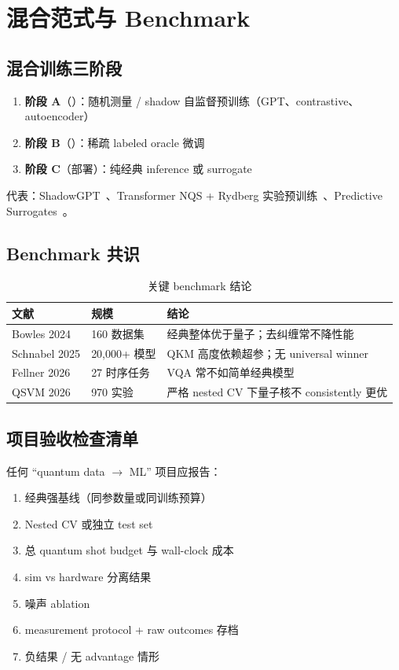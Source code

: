 \section{混合范式与 Benchmark}
\label{sec:hybrid-benchmark}

\subsection{混合训练三阶段}

\begin{enumerate}[leftmargin=*]
  \item \textbf{阶段 A}（\pathtwo{}）：随机测量 / shadow 自监督预训练（GPT、contrastive、autoencoder）
  \item \textbf{阶段 B}（\pathone{}）：稀疏 labeled oracle 微调
  \item \textbf{阶段 C}（部署）：纯经典 inference 或 surrogate
\end{enumerate}

代表：ShadowGPT~\cite{ShadowGPT2024}、Transformer NQS + Rydberg 实验预训练~\cite{TransformerNQSPretrain2025}、Predictive Surrogates~\cite{PredictiveSurrogates2026}。

\subsection{Benchmark 共识}

\begin{table}[htbp]
  \centering
  \caption{关键 benchmark 结论}
  \small
  \begin{tabular}{@{}llp{6.5cm}@{}}
    \toprule
    文献 & 规模 & 结论 \\
    \midrule
    Bowles 2024 & 160 数据集 & 经典整体优于量子；去纠缠常不降性能 \\
    Schnabel 2025 & 20,000+ 模型 & QKM 高度依赖超参；无 universal winner \\
    Fellner 2026 & 27 时序任务 & VQA 常不如简单经典模型 \\
    QSVM 2026 & 970 实验 & 严格 nested CV 下量子核不 consistently 更优 \\
    \bottomrule
  \end{tabular}
\end{table}

\subsection{项目验收检查清单}

任何 ``quantum data $\rightarrow$ ML'' 项目应报告：
\begin{enumerate}[leftmargin=*]
  \item 经典强基线（同参数量或同训练预算）
  \item Nested CV 或独立 test set
  \item 总 quantum shot budget 与 wall-clock 成本
  \item sim vs hardware 分离结果
  \item 噪声 ablation
  \item measurement protocol + raw outcomes 存档
  \item 负结果 / 无 advantage 情形
\end{enumerate}

